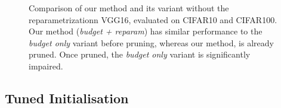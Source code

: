 \begin{figure}
  \centering
  \caption{Comparison of our method and its variant without the
  reparametrizationn VGG16, evaluated on CIFAR10 and CIFAR100. Our method
  (\emph{budget + reparam}) has similar performance to the \emph{budget only}
  variant before pruning, whereas our method, is already pruned. Once pruned,
  the \emph{budget only} variant is significantly impaired.}
  \label{fig:chap1:budget_only_vgg16}
\end{figure}



\subsection{Tuned Initialisation}
\label{sec:chap1:impact_of_fine_tuning}


